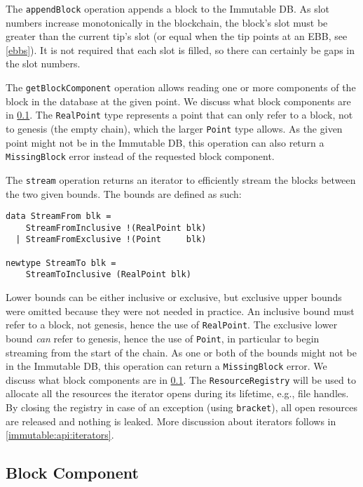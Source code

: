 The \lstinline!appendBlock! operation appends a block to the Immutable DB. As
slot numbers increase monotonically in the blockchain, the block's slot must be
greater than the current tip's slot (or equal when the tip points at an EBB, see
\cref{ebbs}). It is not required that each slot is filled, so there
can certainly be gaps in the slot numbers.

The \lstinline!getBlockComponent! operation allows reading one or more
components of the block in the database at the given point. We discuss what
block components are in \cref{immutable:api:block-component}. The
\lstinline!RealPoint! type represents a point that can only refer to a block,
not to genesis (the empty chain), which the larger \lstinline!Point! type
allows. As the given point might not be in the Immutable DB, this operation can
also return a \lstinline!MissingBlock! error instead of the requested block
component.

The \lstinline!stream! operation returns an iterator to efficiently stream the
blocks between the two given bounds. The bounds are defined as such:
\begin{lstlisting}
data StreamFrom blk =
    StreamFromInclusive !(RealPoint blk)
  | StreamFromExclusive !(Point     blk)

newtype StreamTo blk =
    StreamToInclusive (RealPoint blk)
\end{lstlisting}
Lower bounds can be either inclusive or exclusive, but exclusive upper bounds
were omitted because they were not needed in practice. An inclusive bound must
refer to a block, not genesis, hence the use of \lstinline!RealPoint!. The
exclusive lower bound \emph{can} refer to genesis, hence the use of
\lstinline!Point!, in particular to begin streaming from the start of the chain.
As one or both of the bounds might not be in the Immutable DB, this operation
can return a \lstinline!MissingBlock! error. We discuss what block components
are in \cref{immutable:api:block-component}. The \lstinline!ResourceRegistry!
will be used to allocate all the resources the iterator opens during its
lifetime, e.g., file handles. By closing the registry in case of an exception
(using \lstinline!bracket!), all open resources are released and nothing is
leaked. More discussion about iterators follows in
\cref{immutable:api:iterators}.

\subsection{Block Component}
\label{immutable:api:block-component}

